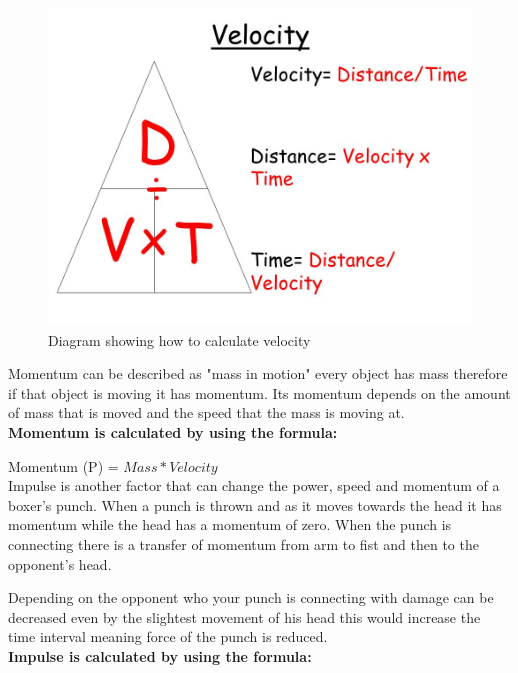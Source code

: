 \documentclass[a4paper,12pt]{report}
\begin{document}
 \begin{figure}[h]
    \begin{center}
    \includegraphics[scale=.3]{images/Velocity.jpeg}
    \caption{Diagram showing how to calculate velocity}
    \label{fig:velocity}
    \end{center}
\end{figure}

Momentum can be described as "mass in motion" every object has mass therefore if that object is moving it has momentum. Its momentum depends on the amount of mass that is moved and the speed that the mass is moving at.\\

\textbf{Momentum is calculated by using the formula:}

Momentum (P) = $Mass * Velocity$\\

Impulse is another factor that can change the power, speed and momentum of a boxer's punch. When a punch is thrown and as it moves towards the head it has momentum while the head has a momentum of zero. When the punch is connecting there is a transfer of momentum from arm to fist and then to the opponent's head.

Depending on the opponent who your punch is connecting with damage can be decreased even by the slightest movement of his head this would increase the time interval meaning force of the punch is reduced.\cite{boxingPhysics} \\

\textbf{Impulse is calculated by using the formula:}
\end{document}
